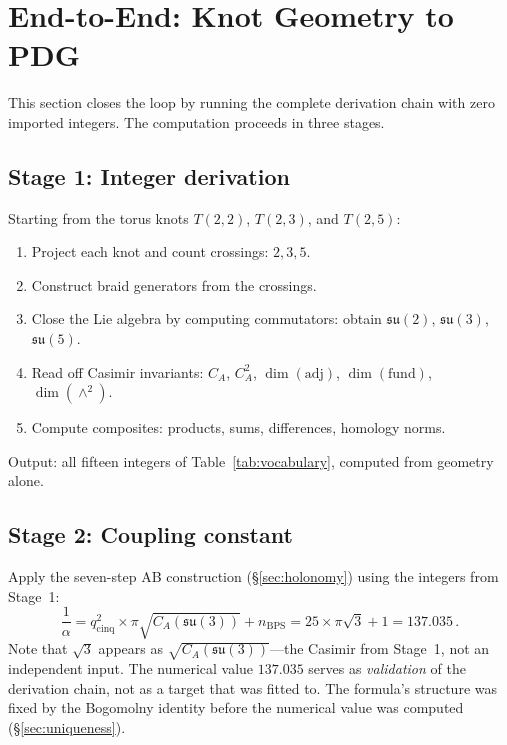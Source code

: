 \documentclass[11pt]{article}
\newcommand{\su}{\mathfrak{su}}
\newcommand{\CA}{C_A}
\begin{document}
\section{End-to-End: Knot Geometry to PDG}
\label{sec:end-to-end}

This section closes the loop by running the complete derivation
chain with zero imported integers.  The computation proceeds in
three stages.

\subsection{Stage 1: Integer derivation}

Starting from the torus knots $T(2,2)$, $T(2,3)$, and $T(2,5)$:
\begin{enumerate}\setlength\itemsep{0pt}
  \item Project each knot and count crossings: $2, 3, 5$.
  \item Construct braid generators from the crossings.
  \item Close the Lie algebra by computing commutators: obtain
    $\su(2)$, $\su(3)$, $\su(5)$.
  \item Read off Casimir invariants: $\CA$, $\CA^2$,
    $\dim(\mathrm{adj})$, $\dim(\mathrm{fund})$,
    $\dim(\wedge^2)$.
  \item Compute composites: products, sums, differences,
    homology norms.
\end{enumerate}
Output: all fifteen integers of Table~\ref{tab:vocabulary},
computed from geometry alone.

\subsection{Stage 2: Coupling constant}

Apply the seven-step AB construction (\S\ref{sec:holonomy}) using
the integers from Stage~1:
\[
\frac{1}{\alpha}
= q_\text{cinq}^2 \times \pi\sqrt{\CA(\su(3))} + n_\text{BPS}
= 25 \times \pi\sqrt{3} + 1
= 137.035\,.
\]
Note that $\sqrt{3}$ appears as $\sqrt{\CA(\su(3))}$---the
Casimir from Stage~1, not an independent input.  The numerical
value $137.035$ serves as \emph{validation} of the derivation
chain, not as a target that was fitted to.  The formula's
structure was fixed by the Bogomolny identity before the
numerical value was computed (\S\ref{sec:uniqueness}).
\end{document}
